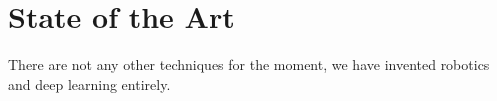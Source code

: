 \section{State of the Art}
There are not any other techniques for the moment, we have invented robotics and deep learning entirely.